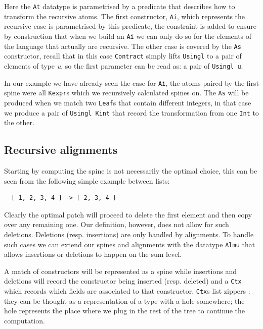 \documentclass[11pt, titlepage]{article}
\begin{document}
Here the \texttt{At} datatype is parametrised by a predicate that describes how 
to transform the recursive atoms. 
The first constructor, \texttt{Ai}, which represents the recursive case is 
parametrised by this predicate, the constraint is added to ensure by construction 
that when we build an \texttt{Ai} we can only do so for the elements of the 
language that actually are recursive.
The other case is covered by the \texttt{As} constructor, recall that in this case \texttt{Contract} simply lifts 
\texttt{Usingl} to a pair of elements of type \emph{u}, so the first parameter 
can be read as: a pair of \texttt{Usingl u}.

In our example we have already seen the case for \texttt{Ai}, the atoms paired 
by the first spine were all \texttt{Kexpr}s which we recursively calculated spines on. 
The \texttt{As} will be produced when we match two \texttt{Leaf}s that contain 
different integers, in that case we produce a pair of \texttt{Usingl Kint} that record 
the transformation from one \texttt{Int} to the other.

\subsection{Recursive alignments}\label{recursive alignments}

Starting by computing the spine is not necessarily the optimal choice, this can 
be seen from the following simple example between lists:

\begin{verbatim}
  [ 1, 2, 3, 4 ] -> [ 2, 3, 4 ]
\end{verbatim}
Clearly the optimal patch will proceed to delete the first element and then 
copy over any remaining one. Our definition, however, does not allow for such 
deletions. Deletions (resp. insertions) are only handled by alignments. To 
handle such cases we can extend our spines and alignments with the datatype 
\texttt{Almu} that allows insertions or deletions to happen on the sum level.

A match of constructors will be represented as a spine while insertions and 
deletions will record the constructor being inserted (resp. deleted) and a 
\texttt{Ctx} which records which fields are associated to that constructor.
\texttt{Ctx}s list zippers \cite{zippers}: they can be thought as a representation 
of a type with a hole somewhere; the hole represents the place where we 
plug in the rest of the tree to continue the computation.
\end{document}
